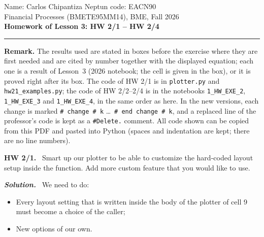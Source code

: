 \documentclass[11pt,a4paper]{article}
\newenvironment{exercise}[1]{\par\medskip\noindent\textbf{#1.}\ }{\par\medskip}
\newcommand{\solution}{\par\noindent\textbf{\textit{Solution.}}\ }
\begin{document}
\noindent Name: Carlos Chipantiza \hfill Neptun code: EACN90\\
\noindent Financial Processes (BMETE95MM14), BME, Fall 2026\\[2pt]
{\large\textbf{Homework of Lesson 3: HW 2/1 -- HW 2/4}}\\[2pt]
\noindent\rule{\textwidth}{0.4pt}

\noindent\textbf{Remark.} The results used are stated in boxes before the exercise where they are first needed and are cited by number together with the displayed equation; each one is a result of Lesson~3 (2026 notebook; the cell is given in the box), or it is proved right after its box. The code of HW 2/1 is in \texttt{plotter.py} and \texttt{hw21\_examples.py}; the code of HW 2/2--2/4 is in the notebooks \texttt{1\_HW\_EXE\_2}, \texttt{1\_HW\_EXE\_3} and \texttt{1\_HW\_EXE\_4}, in the same order as here. In the new versions, each change is marked \texttt{\# change \# k} \dots\ \texttt{\# end change \# k}, and a replaced line of the professor's code is kept as a \texttt{\#Delete.} comment. All code shown can be copied from this PDF and pasted into Python (spaces and indentation are kept; there are no line numbers).

\begin{exercise}{HW 2/1}
Smart up our plotter to be able to customize the hard-coded layout setup inside the function. Add more custom feature that you would like to use.
\end{exercise}
\solution
We need to do: 
\begin{itemize}
	\item [(1)] Every layout setting that is written inside the body of the plotter of cell 9 must become a choice of the caller; 
	\item [(2)] New options of our own.
\end{itemize}
\end{document}
